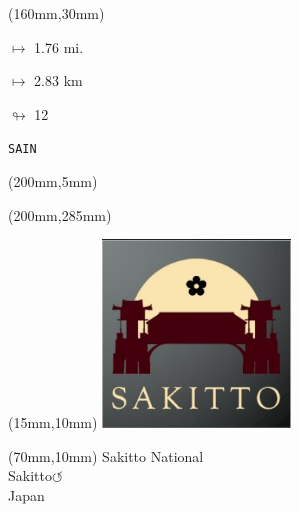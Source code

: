 \begin{textblock*}{40mm}(160mm,30mm)%
\Large
\par$\mapsto$ 1.76 mi.
\par$\mapsto$ 2.83 km
\par$\looparrowright$ 12
\par\hfill\tiny\tt SAIN\\
\end{textblock*}
\begin{textblock*}{20mm}(200mm,5mm)%
\fbox{\thepage}
\label{SAIN}
\end{textblock*}
\begin{textblock*}{20mm}(200mm,285mm)%
\fbox{\thepage}
\end{textblock*}

\null\newpage
\begin{textblock*}{50mm}(15mm,10mm)%
\includegraphics[width=50mm]{LG/2015-05-20_00093.png}
\end{textblock*}
\begin{textblock*}{130mm}(70mm,10mm)%
{\fontsize{20}{20}\selectfont Sakitto National\\}
{\fontsize{16}{16}\selectfont Sakitto\hfill \huge$\circlearrowleft$\\}
{\fontsize{12}{12}\selectfont Japan\\}
\end{textblock*}
